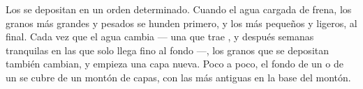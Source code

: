Los  se depositan en un orden determinado. Cuando el agua
cargada de  frena, los granos más grandes y pesados se hunden primero,
y los más pequeños y ligeros, al final. Cada vez que el agua cambia --- una
 que trae , y después semanas tranquilas en las que solo llega
 fino al fondo ---, los granos que se depositan también cambian, y
empieza una capa nueva. Poco a poco, el fondo de un  o de un  se
cubre de un montón de capas, con las más antiguas en la base del montón.

